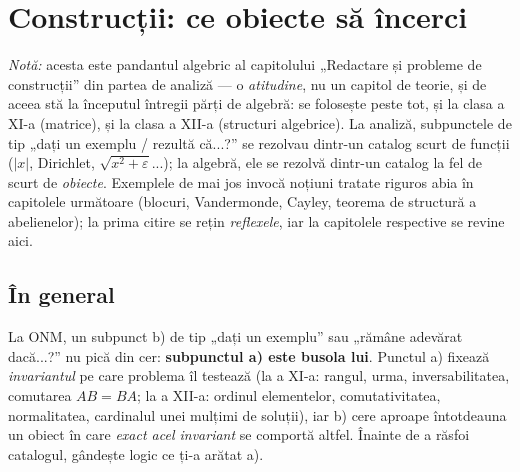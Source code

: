 \chapter{Construcții: ce obiecte să încerci}\label{ch:obiecte}

\emph{Notă:} acesta este pandantul algebric al capitolului „Redactare și probleme de construcții'' din partea de analiză --- o \emph{atitudine}, nu un capitol de teorie, și de aceea stă la începutul întregii părți de algebră: se folosește peste tot, și la clasa a XI-a (matrice), și la clasa a XII-a (structuri algebrice). La analiză, subpunctele de tip „dați un exemplu / rezultă că...?'' se rezolvau dintr-un catalog scurt de funcții ($|x|$, Dirichlet, $\sqrt{x^2+\varepsilon}$...); la algebră, ele se rezolvă dintr-un catalog la fel de scurt de \emph{obiecte}. Exemplele de mai jos invocă noțiuni tratate riguros abia în capitolele următoare (blocuri, Vandermonde, Cayley, teorema de structură a abelienelor); la prima citire se rețin \emph{reflexele}, iar la capitolele respective se revine aici.

\section{În general}

La ONM, un subpunct b) de tip „dați un exemplu'' sau „rămâne adevărat dacă...?'' nu pică din cer: \textbf{subpunctul a) este busola lui}. Punctul a) fixează \emph{invariantul} pe care problema îl testează (la a XI-a: rangul, urma, inversabilitatea, comutarea $AB=BA$; la a XII-a: ordinul elementelor, comutativitatea, normalitatea, cardinalul unei mulțimi de soluții), iar b) cere aproape întotdeauna un obiect în care \emph{exact acel invariant} se comportă altfel. Înainte de a răsfoi catalogul, gândește logic ce ți-a arătat a).

